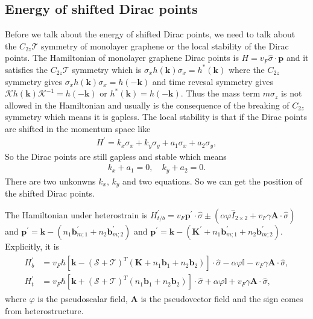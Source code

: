 \documentclass[10pt, oneside]{article}
\newcommand{\vph}{\varphi}
\newcommand{\pr}{\prime}
\newcommand{\mr}[1]{\mathrm{#1}}
\newcommand{\p}[1]{\left(#1\right)}
\newcommand{\bb}[1]{\left[#1\right]}
\begin{document}
\subsection{Energy of shifted Dirac points}
Before we talk about the energy of shifted Dirac points, we need to talk about the \(C_{2z} \mathcal{T}\) symmetry of monolayer graphene or the local stability of the Dirac points. The Hamiltonian of monolayer graphene Dirac points is \(H = v_{F} \hat{\sigma} \cdot \bm{p}\) and it satisfies the \(C_{2z} \mathcal{T}\) symmetry which is \(\sigma_{x} h \p{\bm{k}} \sigma_{x} = h^{*} \p{\bm{k}}\) where the \(C_{2z}\) symmetry gives \(\sigma_x h \p{\bm{k}} \sigma_x = h\p{- \bm{k}}\) and time revesal symmetry gives \( \mathcal{K} h \p{\bm{k}} \mathcal{K}^{-1} = h \p{- \bm{k}}\) or \(h^{*} \p{\bm{k}} = h \p{-\bm{k}}\). Thus the mass term \(m \sigma_z\) is not allowed in the Hamiltonian and usually is the consequence of the breaking of \(C_{2z}\) symmetry which means it is gapless. The local stability is that if the Dirac points are shifted in the momentum space like
\begin{align}
	H^\pr = k_x \sigma_x + k_y \sigma_y + a_1 \sigma_x + a_2 \sigma_y,
\end{align}
So the Dirac points are still gapless and stable which means 
\begin{align}
		k_x + a_1 = 0, \quad k_y + a_2 = 0.
\end{align}
There are two unkonwns \(k_x, \, k_y\) and two equations. So we can get the position of the shifted Dirac points.


The Hamiltonian under heterostrain is \(H^{\pr}_{t/b} = v_F \bm{p}^\pr \cdot \hat{\sigma} \pm \p{\alpha \vph \hat{I}_{\mr{2 \times 2}} + v_F \gamma \bm{A} \cdot \hat{\sigma}}\) and \(\bm{p}^\pr = \bm{k} - \p{n_1 \bm{b}^{\pr}_{m;1} + n_2 \bm{b}^{\pr}_{m;2}}\) and  \(\bm{p}^\pr = \bm{k} - \p{\bm{K}^\prime + n_1 \bm{b}^{\pr}_{m;1} + n_2 \bm{b}^{\pr}_{m;2}}\). Explicitly, it is
\begin{align}
	\begin{split}
		H^{\pr}_{b} & = v_{F} \hbar \bb{\bm{k} -  \p{\mathcal{S} + \mathcal{T}}^{T} \p{\bm{K} + n_1 \bm{b}_{1} + n_2 \bm{b}_{2}} } \cdot \hat{\sigma} - \alpha \vph \mathbb{I} - v_F \gamma \bm{A} \cdot \hat{\sigma}, \\
		H^{\pr}_{t} & = v_{F} \hbar \bb{\bm{k} +  \p{\mathcal{S} + \mathcal{T}}^{T} \p{n_1 \bm{b}_{1} + n_2 \bm{b}_{2}} } \cdot \hat{\sigma} + \alpha \vph \mathbb{I} + v_F \gamma \bm{A} \cdot \hat{\sigma},
	\end{split}
\end{align}
where \(\vph\) is the pseudoscalar field, \(\bm{A}\) is the pseudovector field and the sign comes from heterostructure.
\end{document}
